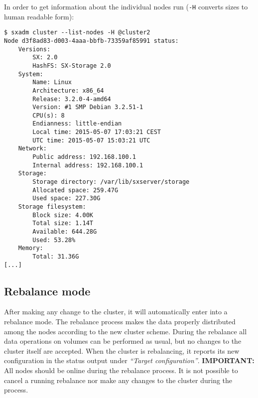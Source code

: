 In order to get information about the individual nodes run (\verb+-H+ converts
sizes to human readable form):
\begin{lstlisting}
$ sxadm cluster --list-nodes -H @cluster2
Node d3f8ad83-d003-4aaa-bbfb-73359af85991 status:
    Versions:
        SX: 2.0
        HashFS: SX-Storage 2.0
    System:
        Name: Linux
        Architecture: x86_64
        Release: 3.2.0-4-amd64
        Version: #1 SMP Debian 3.2.51-1
        CPU(s): 8
        Endianness: little-endian
        Local time: 2015-05-07 17:03:21 CEST
        UTC time: 2015-05-07 15:03:21 UTC
    Network:
        Public address: 192.168.100.1
        Internal address: 192.168.100.1
    Storage:
        Storage directory: /var/lib/sxserver/storage
        Allocated space: 259.47G
        Used space: 227.30G
    Storage filesystem:
        Block size: 4.00K
        Total size: 1.14T
        Available: 644.28G
        Used: 53.28%
    Memory:
        Total: 31.36G
[...]
\end{lstlisting}

\subsection{Rebalance mode}
After making any change to the cluster, it will automatically enter into
a rebalance mode. The rebalance process makes the data properly distributed
among the nodes according to the new cluster scheme. During the rebalance
all data operations on volumes can be performed as usual, but no changes
to the cluster itself are accepted. When the cluster is rebalancing, it
reports its new configuration in the status output under
\emph{``Target configuration''}. \textbf{IMPORTANT: } All nodes should be
online during the rebalance process. It is not possible to cancel a running
rebalance nor make any changes to the cluster during the process.

